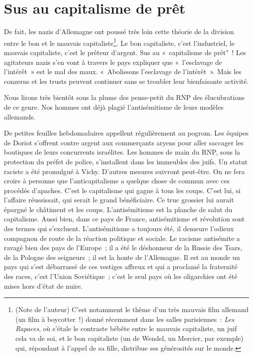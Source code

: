 \documentclass[french,twoside]{book} %
\begin{document}
\section[Sus au capitalisme de prêt]{Sus au capitalisme de prêt}
\noindent De fait, les nazis d’Allemagne ont poussé très loin cette théorie de la division entre le bon et le mauvais capitaliste\footnote{(Note de l’auteur) C’est notamment le thème d’un très mauvais film allemand (un film à boycotter !) donné récemment dans les salles parisiennes : \emph{Les Rapaces}, où s’étale le contraste bébête entre le mauvais capitaliste, un juif cela va de soi, et le bon capitaliste (un de Wendel, un Mercier, par exemple) qui, répondant à l’appel de sa fille, distribue ses générosités sur le monde.}. Le bon capitaliste, c’est l’industriel, le mauvais capitaliste, c’est le prêteur d’argent. Sus au « capitalisme de prêt" ! Les agitateurs nazis s’en vont à travers le pays expliquer que « l’esclavage de l’intérêt » est le mal des maux. « Abolissons l’esclavage de l’intérêt ». Mais les conzerns et les trusts peuvent continuer sans se troubler leur bienfaisante activité.\par
Nous lirons très bientôt sous la plume des pense-petit du RNP des élucubrations de ce genre. Nos hommes ont déjà plagié l’antisémitisme de leurs modèles allemands.\par
De petites feuilles hebdomadaires appellent régulièrement au pogrom. Les équipes de Doriot s’offrent contre argent aux commerçants aryens pour aller saccager les boutiques de leurs concurrents israélites. Les hommes de main du RNP, sous la protection du préfet de police, s’installent dans les immeubles des juifs. Un statut raciste a été promulgué à Vichy. D’autres mesures suivront peut-être. On ne fera croire à personne que l’anticapitalisme a quelque chose de commun avec ces procédés d’apaches. C’est le capitalisme qui gagne à tous les coups. C’est lui, si l’affaire réussissait, qui serait le grand bénéficiaire. Ce truc grossier lui aurait épargné le châtiment et les coups. L’antisémitisme est la planche de salut du capitalisme. Aussi bien, dans ce pays de France, antisémitisme et révolution sont des termes qui s’excluent. L’antisémitisme a toujours été, il demeure l’odieux compagnon de route de la réaction politique et sociale. Le racisme antisémite a ravagé bien des pays de l’Europe ; il a été le déshonneur de la Russie des Tsars, de la Pologne des seigneurs ; il est la honte de l’Allemagne. Il est au monde un pays qui s’est débarrassé de ces vestiges affreux et qui a proclamé la fraternité des races, c’est l’Union Soviétique ; c’est le seul pays où les oligarchies ont été mises hors d’état de nuire.
\end{document}

